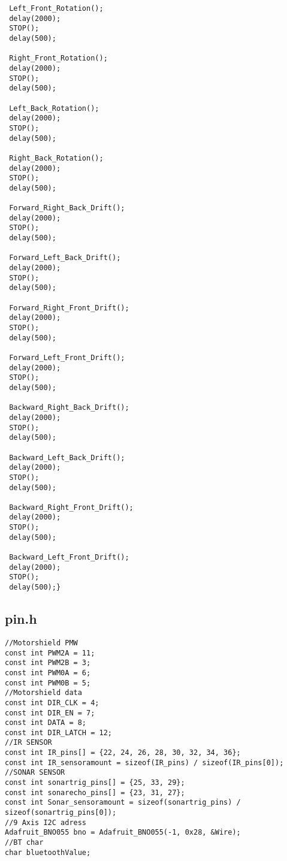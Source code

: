 \begin{lstlisting}
 Left_Front_Rotation();
 delay(2000);
 STOP();
 delay(500);

 Right_Front_Rotation();
 delay(2000);
 STOP();
 delay(500);

 Left_Back_Rotation();
 delay(2000);
 STOP();
 delay(500);

 Right_Back_Rotation();
 delay(2000);
 STOP();
 delay(500);

 Forward_Right_Back_Drift();
 delay(2000);
 STOP();
 delay(500);

 Forward_Left_Back_Drift();
 delay(2000);
 STOP();
 delay(500);

 Forward_Right_Front_Drift();
 delay(2000);
 STOP();
 delay(500);
 
 Forward_Left_Front_Drift();
 delay(2000);
 STOP();
 delay(500);

 Backward_Right_Back_Drift();
 delay(2000);
 STOP();
 delay(500);

 Backward_Left_Back_Drift();
 delay(2000);
 STOP();
 delay(500);

 Backward_Right_Front_Drift();
 delay(2000);
 STOP();
 delay(500);

 Backward_Left_Front_Drift();
 delay(2000);
 STOP();
 delay(500);}
\end{lstlisting}
\subsection{pin.h}
\begin{lstlisting}
//Motorshield PMW
const int PWM2A = 11;
const int PWM2B = 3;
const int PWM0A = 6;
const int PWM0B = 5;
//Motorshield data
const int DIR_CLK = 4;
const int DIR_EN = 7;
const int DATA = 8;
const int DIR_LATCH = 12;
//IR SENSOR
const int IR_pins[] = {22, 24, 26, 28, 30, 32, 34, 36};
const int IR_sensoramount = sizeof(IR_pins) / sizeof(IR_pins[0]);
//SONAR SENSOR
const int sonartrig_pins[] = {25, 33, 29};
const int sonarecho_pins[] = {23, 31, 27};
const int Sonar_sensoramount = sizeof(sonartrig_pins) / sizeof(sonartrig_pins[0]);
//9 Axis I2C adress
Adafruit_BNO055 bno = Adafruit_BNO055(-1, 0x28, &Wire);
//BT char
char bluetoothValue;
\end{lstlisting}
